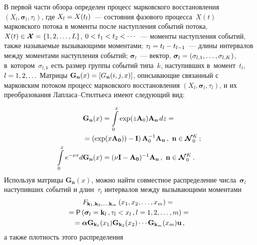 \begin{multicols}{2}
  В первой части обзора определен процесс марковского восстановления 
$(X_l,\boldsymbol{\sigma}_l, \tau_l)$, где $X_l\hm= X(t_l)$~--- состояния 
фазового процесса~$X(t)$ марковского потока в моменты после наступления\linebreak 
событий потока, $X(t)\hm\in \boldsymbol{\mathcal{X}} \hm= \{1,2,\ldots ,L\}$, 
$0\hm< t_1\hm< t_2
  <\cdots$~--- моменты наступления событий, также называемые 
вызывающими моментами; $\tau_l\hm= t_l\hm- t_{l-1}$~--- длины интервалов 
между \mbox{моментами} наступления событий; $\boldsymbol{\sigma}_l$~--- вектор, 
$\boldsymbol{\sigma}_l\hm= (\sigma_{l,1}, \ldots , \sigma_{l,K})$, 
в~котором~$\sigma_{l,k}$ есть размер группы событий типа~$k$, наступивших 
в~момент~$t_l$, $l\hm=1, 2, \ldots$ Матрицы $\mathbf{G}_{\mathbf{n}}(x)\hm= 
[G_{\mathbf{n}}(i,j,x)]$, описывающие связанный с марковским потоком 
процесс марковского восстановления $(X_l, \boldsymbol{\sigma}_l, \tau_l)$, и 
их преобразования Лап\-ла\-са--Стилть\-еса имеют следующий вид:

\noindent
  \begin{align}
  \mathbf{G}_{\mathbf{n}}(x)&=\int\limits_0^x \exp 
(z\mathbf{A}_0)\mathbf{A}_{\mathbf{n}}\,dz={}\notag\\
&\hspace*{-10mm}{}=\left( \exp 
(x\mathbf{A}_{\mathbf{0}}))-\mathbf{I}\right)\mathbf{A}_0^{-1} \mathbf{A}_{\mathbf{n}}\,,\ \mathbf{n}\in 
\boldsymbol{\mathcal{N}}_0^K\,;
  \label{e1-nau}\\
  \int\limits_0^x e^{-\nu x}d\mathbf{G}_{\mathbf{n}}(x)&= (\nu\mathbf{I}-
\mathbf{A}_{\mathbf{0}})^{-1}\mathbf{A}_{\mathbf{n}}\,,\ \mathbf{n}\in 
\boldsymbol{\mathcal{N}}_0^K\,.
  \label{e2-nau}
  \end{align}
Используя матрицы $\mathbf{G}_{\mathbf{n}}(x)$, можно найти совместное 
распределение числа~$\boldsymbol{\sigma}_l$ наступивших событий и 
длин~$\tau_l$ интервалов между вызывающими моментами 
\begin{multline}
F_{\mathbf{k}_1, \mathbf{k}_2, \ldots , \mathbf{k}_m} \left(x_1, x_2, \ldots , 
x_m\right)={}\\
{}={\sf P}\left(
\boldsymbol{\sigma}_l=\mathbf{k}_l\,, \tau_l<x_l\,, l=1,2,\ldots, m\right)={}\\
{}=\bm{\alpha}\mathbf{G}_{\mathbf{k}_1}(x_1) \mathbf{G}_{\mathbf{k}_2}(x_2)\cdots 
\mathbf{G}_{\mathbf{k}_m}(x_m)\mathbf{u}\,,
\label{e3-nau}
\end{multline}
а также плотность этого распределения

\columnbreak


\end{multicols}
